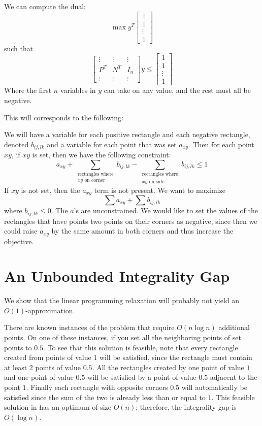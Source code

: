\documentclass[11pt]{article}
\begin{document}
We can compute the dual:
\[ \max y^T \left[ \begin{array}{c} 1 \\ 1 \\ \vdots \\ 1 \end{array} \right] \]
such that
\[ \left[ \begin{array}{ccc} \vdots & \vdots & \vdots \\
					  P^T & N^T & I_n \\
					\vdots & \vdots & \vdots \end{array} \right] y
\leq  \left[ \begin{array}{c} 1 \\ 1 \\ \vdots \\ 1 \end{array} \right] \]
Where the first $n$ variables in $y$ can take on any value, and the rest must all be negative. 

This will corresponds to the following:

We will have a variable for each positive rectangle and each negative rectangle, denoted $b_{ij, lk}$ and a variable for each point that was set $a_{xy}$. Then for each point $xy$, if $xy$ is set, then we have the following constraint:
\[ a_{xy} + \sum_{\begin{array}{c}\text{rectangles where}\\\text{$xy$ on corner}\end{array}} b_{ij, lk} - \sum_{\begin{array}{c}\text{rectangles where}\\\text{$xy$ on side}\end{array}} b_{ij,lk} \leq 1 \]
If $xy$ is not set, then the $a_{xy}$ term is not present. We want to maximize
\[ \sum a_{xy} + \sum b_{ij,lk} \]
where $b_{ij,lk} \leq 0$. The $a$'s are unconstrained. We would like to set the values of the rectangles that have points two points on their corners as negative, since then we could raise $a_{xy}$ by the same amount in both corners and thus increase the objective.

\section{An Unbounded Integrality Gap}

We show that the linear programming relaxation will probably not yield an $O(1)$-approximation.

There are known instances of the problem that require $O(n\log n)$ additional points. On one of these instances, if you set all the neighboring points of set points to $0.5$. To see that this solution is feasible, note that every rectangle created from points of value 1 will be satisfied, since the rectangle must contain at least 2 points of value $0.5$. All the rectangles created by one point of value $1$ and one point of value $0.5$ will be satisfied by a point of value $0.5$ adjacent to the point $1$. Finally each rectangle with opposite corners $0.5$ will automatically be satisfied since the sum of the two is already less than or equal to 1. This feasible solution in has an optimum of size $O(n)$; therefore, the integrality gap is $O(\log n)$. 
\end{document}
